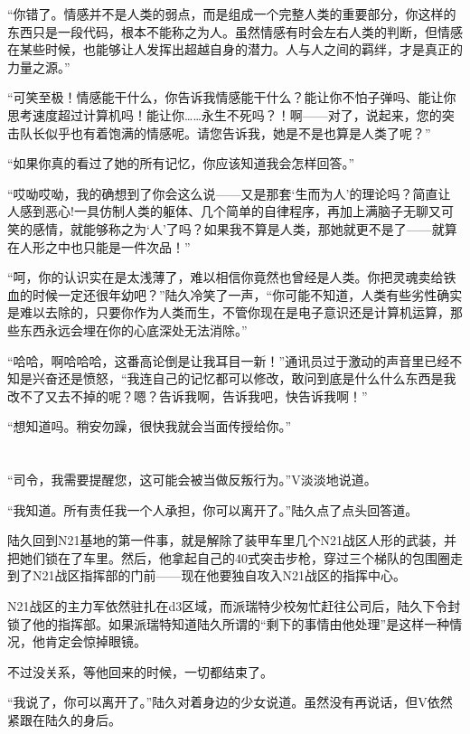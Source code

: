 “你错了。情感并不是人类的弱点，而是组成一个完整人类的重要部分，你这样的东西只是一段代码，根本不能称之为人。虽然情感有时会左右人类的判断，但情感在某些时候，也能够让人发挥出超越自身的潜力。人与人之间的羁绊，才是真正的力量之源。”

“可笑至极！情感能干什么，你告诉我情感能干什么？能让你不怕子弹吗、能让你思考速度超过计算机吗！能让你……永生不死吗？！啊——对了，说起来，您的突击队长似乎也有着饱满的情感呢。请您告诉我，她是不是也算是人类了呢？”

“如果你真的看过了她的所有记忆，你应该知道我会怎样回答。”

“哎呦哎呦，我的确想到了你会这么说——又是那套‘生而为人’的理论吗？简直让人感到恶心!一具仿制人类的躯体、几个简单的自律程序，再加上满脑子无聊又可笑的感情，就能够称之为‘人’了吗？如果我不算是人类，那她就更不是了——就算在人形之中也只能是一件次品！”

“呵，你的认识实在是太浅薄了，难以相信你竟然也曾经是人类。你把灵魂卖给铁血的时候一定还很年幼吧？”陆久冷笑了一声，“你可能不知道，人类有些劣性确实是难以去除的，只要你作为人类而生，不管你现在是电子意识还是计算机运算，那些东西永远会埋在你的心底深处无法消除。”

“哈哈，啊哈哈哈，这番高论倒是让我耳目一新！”通讯员过于激动的声音里已经不知是兴奋还是愤怒，“我连自己的记忆都可以修改，敢问到底是什么什么东西是我改不了又去不掉的呢？嗯？告诉我啊，告诉我吧，快告诉我啊！”

“想知道吗。稍安勿躁，很快我就会当面传授给你。” 

\section*{}

“司令，我需要提醒您，这可能会被当做反叛行为。”V淡淡地说道。

“我知道。所有责任我一个人承担，你可以离开了。”陆久点了点头回答道。

陆久回到N21基地的第一件事，就是解除了装甲车里几个N21战区人形的武装，并把她们锁在了车里。然后，他拿起自己的40式突击步枪，穿过三个梯队的包围圈走到了N21战区指挥部的门前——现在他要独自攻入N21战区的指挥中心。

N21战区的主力军依然驻扎在d3区域，而派瑞特少校匆忙赶往公司后，陆久下令封锁了他的指挥部。如果派瑞特知道陆久所谓的“剩下的事情由他处理”是这样一种情况，他肯定会惊掉眼镜。

不过没关系，等他回来的时候，一切都结束了。

“我说了，你可以离开了。”陆久对着身边的少女说道。虽然没有再说话，但V依然紧跟在陆久的身后。

